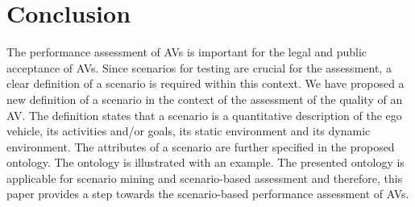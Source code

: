 \section{Conclusion}
\label{sec:conclusion}

The performance assessment of AVs is important for the legal and public acceptance of AVs. 
Since scenarios for testing are crucial for the assessment, a clear definition of a scenario is required within this context. 
We have proposed a new definition of a scenario in the context of the assessment of the quality of an AV. 
The definition states that a scenario is a quantitative description of the ego vehicle, its activities and/or goals, its static environment and its dynamic environment. 
The attributes of a scenario are further specified in the proposed ontology.
The ontology is illustrated with an example.
The presented ontology is applicable for scenario mining and scenario-based assessment and therefore, this paper provides a step towards the scenario-based performance assessment of AVs. 
